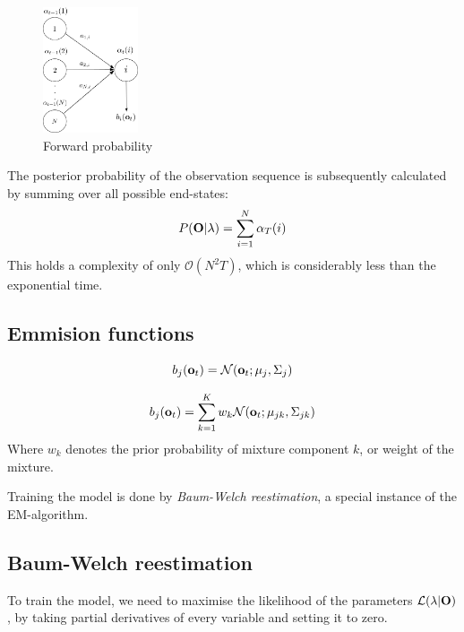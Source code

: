 \documentclass[conference]{IEEEtran}
\begin{document}
\begin{figure}[H]
\centering
\includegraphics[width=0.25\textwidth]{forward2.jpg}
 \caption{Forward probability}
\end{figure}
The posterior probability of the observation sequence is subsequently calculated by summing over all possible end-states:
\begin{equation}
 P({\bf O}|\lambda) = \displaystyle \sum_{i = 1}^{N} \alpha_{T}(i)
\end{equation}
This holds a complexity of only $\mathcal{O}(N^{2}T)$, which is considerably less than the exponential time.
\subsection{Emmision functions}
\begin{equation}
\label{GausProbability}
 b_{j}({\bf o}_{t}) = \mathcal{N}({\bf o}_{t}; \mu_{j}, \Sigma_{j})
\end{equation}

\begin{equation}
\label{MOGprobability}
 b_{j}({\bf o}_{t}) = \displaystyle \sum_{k = 1}^K w_{k} \mathcal{N}({\bf o}_{t}; \mu_{jk}, \Sigma_{jk})
\end{equation}
Where $w_{k}$ denotes the prior probability of mixture component $k$, or weight of the mixture. 

Training the model is done by {\it Baum-Welch reestimation}, a special instance of the EM-algorithm.
\subsection{Baum-Welch reestimation}

To train the model, we need to maximise the likelihood of the parameters $\mathcal{L}(\lambda|{\bf O})$, by taking partial derivatives of every variable and setting it to zero.
\end{document}

